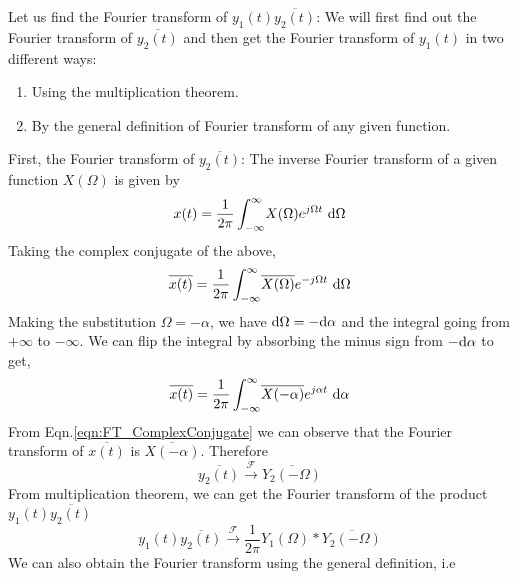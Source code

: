 		Let us find the Fourier transform of $y_1(t)\overline{y_2(t)}$:
		We will first find out the Fourier transform of $\overline{y_2(t)}$ and then get the Fourier transform of $y_1(t)$ in two different ways:\begin{enumerate}
			\item Using the multiplication theorem.
			\item By the general definition of Fourier transform of any given function.
		\end{enumerate}
		First, the Fourier transform of  $\overline{y_2(t)}$:
		The inverse Fourier transform of a given function $X(\Omega)$ is given by 
		\begin{equation*}
			x(t) = \frac{1}{2\pi} \int_{-\infty}^{\infty} \! X(\Omega) e^{j \Omega t} \ \mathrm{d} \Omega
		\end{equation*}
		Taking the complex conjugate of the above,
		\begin{equation*}
			\overline{x(t)} = \frac{1}{2\pi} \int_{-\infty}^{\infty} \! \overline{X(\Omega)} e^{-j \Omega t} \ \mathrm{d} \Omega
		\end{equation*}
		Making the substitution $\Omega = -\alpha$, we have $\mathrm{d} \Omega = - \mathrm{d} \alpha $ and the integral going from $+\infty$ to $-\infty$.
		We can flip the integral by absorbing the minus sign from $-\mathrm{d} \alpha$ to get,
		\begin{equation}\label{eqn:FT_ComplexConjugate}
			\overline{x(t)} = \frac{1}{2\pi} \int_{-\infty}^{\infty} \! \overline{X(-\alpha)} e^{j \alpha t} \ \mathrm{d} \alpha
		\end{equation}
		From Eqn.\ref{eqn:FT_ComplexConjugate} we can observe that the Fourier transform of  $\overline{x(t)}$ is $\overline{X(-\alpha)}$.
		Therefore 
		\begin{equation*}
			\overline{y_2(t)}
			\xrightarrow{\mathcal{F}}
			\overline{Y_2(-\Omega)}
		\end{equation*}
		From multiplication theorem, we can get the Fourier transform of the product $y_1(t)\overline{y_2(t)}$
		\begin{equation*}
			y_1(t)\overline{y_2(t)}
			\xrightarrow{\mathcal{F}}
			\frac{1}{2\pi} { 
			Y_1(\Omega) 
			\ast 
			\overline{Y_2(-\Omega)}}
		\end{equation*}
		We can also obtain the Fourier transform using the general definition, i.e
